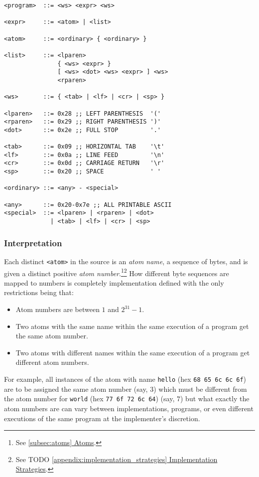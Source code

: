 \documentclass[twocolumn]{report}
\newcommand{\intralink}[2]{\hyperref[#1]{\ref*{#1} #2}}
\begin{document}
\begin{verbatim}
<program>  ::= <ws> <expr> <ws>

<expr>     ::= <atom> | <list>

<atom>     ::= <ordinary> { <ordinary> }

<list>     ::= <lparen>
               { <ws> <expr> }
               [ <ws> <dot> <ws> <expr> ] <ws>
               <rparen>

<ws>       ::= { <tab> | <lf> | <cr> | <sp> }

<lparen>   ::= 0x28 ;; LEFT PARENTHESIS  '('
<rparen>   ::= 0x29 ;; RIGHT PARENTHESIS ')'
<dot>      ::= 0x2e ;; FULL STOP         '.'

<tab>      ::= 0x09 ;; HORIZONTAL TAB    '\t'
<lf>       ::= 0x0a ;; LINE FEED         '\n'
<cr>       ::= 0x0d ;; CARRIAGE RETURN   '\r'
<sp>       ::= 0x20 ;; SPACE             ' '

<ordinary> ::= <any> - <special>

<any>      ::= 0x20-0x7e ;; ALL PRINTABLE ASCII
<special>  ::= <lparen> | <rparen> | <dot>
             | <tab> | <lf> | <cr> | <sp>
\end{verbatim}

\subsubsection{Interpretation}
\label{subsubsec:interpretation}

Each distinct \texttt{<atom>} in the source is an \emph{atom name}, a sequence of bytes, and is given a distinct positive \emph{atom number}.\footnote{See \intralink{subsec:atoms}{Atoms}.}\footnote{See TODO \intralink{appendix:implementation_strategies}{Implementation Strategies}.}
How different byte sequences are mapped to numbers is completely implementation defined with the only restrictions being that:

\begin{itemize}
\item Atom numbers are between $1$ and $2^{31} - 1$.
\item Two atoms with the same name within the same execution of a program get the same atom number.
\item Two atoms with different names within the same execution of a program get different atom numbers.
\end{itemize}

For example, all instances of the atom with name \texttt{hello} (hex \texttt{68 65 6c 6c 6f}) are to be assigned the same atom number (say, $3$) which must be different from the atom number for \texttt{world} (hex \texttt{77 6f 72 6c 64}) (say, $7$) but what exactly the atom numbers are can vary between implementations, programs, or even different executions of the same program at the implementer's discretion.
\end{document}
